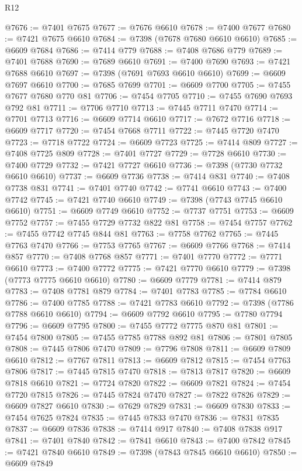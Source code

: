 \begin{lexlean}{R12}
\begin{coremodule}
{{{{{{{{{{{{{{{{{{{{{{{{{{{{{{{{{{{{{{{{{{{{{{{{{{{{{{{{{{{{{{{{{{{{{{{{{{{{{{{{{{@7676 := @7401 @7675
@7677 := @7676 @6610
@7678 := @7400 @7677
@7680 := @7421 @7675 @6610
@7684 := @7398 (@7678 @7680 @6610 @6610)
@7685 := @6609 @7684
@7686 := @7414 @779
@7688 := @7408 @7686 @779
@7689 := @7401 @7688
@7690 := @7689 @6610
@7691 := @7400 @7690
@7693 := @7421 @7688 @6610
@7697 := @7398 (@7691 @7693 @6610 @6610)
@7699 := @6609 @7697 @6610
@7700 := @7685 @7699
@7701 := @6609 @7700
@7705 := @7455 @7677 @7680 @770 @81
@7706 := @7454 @7705
@7710 := @7455 @7690 @7693 @792 @81
@7711 := @7706 @7710
@7713 := @7445 @7711 @7470
@7714 := @7701 @7713
@7716 := @6609 @7714 @6610
@7717 := @7672 @7716
@7718 := @6609 @7717
@7720 := @7454 @7668 @7711
@7722 := @7445 @7720 @7470
@7723 := @7718 @7722
@7724 := @6609 @7723
@7725 := @7414 @809
@7727 := @7408 @7725 @809
@7728 := @7401 @7727
@7729 := @7728 @6610
@7730 := @7400 @7729
@7732 := @7421 @7727 @6610
@7736 := @7398 (@7730 @7732 @6610 @6610)
@7737 := @6609 @7736
@7738 := @7414 @831
@7740 := @7408 @7738 @831
@7741 := @7401 @7740
@7742 := @7741 @6610
@7743 := @7400 @7742
@7745 := @7421 @7740 @6610
@7749 := @7398 (@7743 @7745 @6610 @6610)
@7751 := @6609 @7749 @6610
@7752 := @7737 @7751
@7753 := @6609 @7752
@7757 := @7455 @7729 @7732 @822 @81
@7758 := @7454 @7757
@7762 := @7455 @7742 @7745 @844 @81
@7763 := @7758 @7762
@7765 := @7445 @7763 @7470
@7766 := @7753 @7765
@7767 := @6609 @7766
@7768 := @7414 @857
@7770 := @7408 @7768 @857
@7771 := @7401 @7770
@7772 := @7771 @6610
@7773 := @7400 @7772
@7775 := @7421 @7770 @6610
@7779 := @7398 (@7773 @7775 @6610 @6610)
@7780 := @6609 @7779
@7781 := @7414 @879
@7783 := @7408 @7781 @879
@7784 := @7401 @7783
@7785 := @7784 @6610
@7786 := @7400 @7785
@7788 := @7421 @7783 @6610
@7792 := @7398 (@7786 @7788 @6610 @6610)
@7794 := @6609 @7792 @6610
@7795 := @7780 @7794
@7796 := @6609 @7795
@7800 := @7455 @7772 @7775 @870 @81
@7801 := @7454 @7800
@7805 := @7455 @7785 @7788 @892 @81
@7806 := @7801 @7805
@7808 := @7445 @7806 @7470
@7809 := @7796 @7808
@7811 := @6609 @7809 @6610
@7812 := @7767 @7811
@7813 := @6609 @7812
@7815 := @7454 @7763 @7806
@7817 := @7445 @7815 @7470
@7818 := @7813 @7817
@7820 := @6609 @7818 @6610
@7821 := @7724 @7820
@7822 := @6609 @7821
@7824 := @7454 @7720 @7815
@7826 := @7445 @7824 @7470
@7827 := @7822 @7826
@7829 := @6609 @7827 @6610
@7830 := @7629 @7829
@7831 := @6609 @7830
@7833 := @7454 @7625 @7824
@7835 := @7445 @7833 @7470
@7836 := @7831 @7835
@7837 := @6609 @7836
@7838 := @7414 @917
@7840 := @7408 @7838 @917
@7841 := @7401 @7840
@7842 := @7841 @6610
@7843 := @7400 @7842
@7845 := @7421 @7840 @6610
@7849 := @7398 (@7843 @7845 @6610 @6610)
@7850 := @6609 @7849
}}}}}}}}}}}}}}}}}}}}}}}}}}}}}}}}}}}}}}}}}}}}}}}}}}}}}}}}}}}}}}}}}}}}}}}}}}}}}}}}}}
\end{coremodule}
\end{lexlean}
